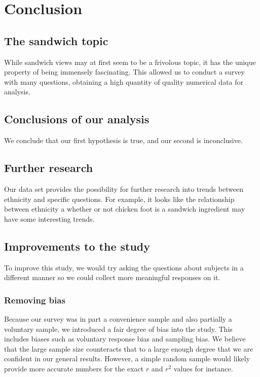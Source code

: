 \chapter{Conclusion}

\section{The sandwich topic}
While sandwich views may at first seem to be a frivolous topic, it has the unique property of being immensely fascinating.
This allowed us to conduct a survey with many questions, obtaining a high quantity of quality numerical data for analysis.

\section{Conclusions of our analysis}
We conclude that our first hypothesis is true, and our second is inconclusive.

\section{Further research}
Our data set provides the possibility for further research into trends between ethnicity and specific questions.
For example, it looks like the relationship between ethnicity a whether or not chicken foot is a sandwich ingredient may have some interesting trends.

\section{Improvements to the study}
To improve this study, we would try asking the questions about subjects in a different manner so we could collect more meaningful responses on it.

\subsection{Removing bias}
Because our survey was in part a convenience sample and also partially a voluntary sample, we introduced a fair degree of bias into the study.
This includes biases such as voluntary response bias and sampling bias.
We believe that the large sample size counteracts that to a large enough degree that we are confident in our general results.
However, a simple random sample would likely provide more accurate numbers for the exact $r$ and $r^2$ values for instance.
